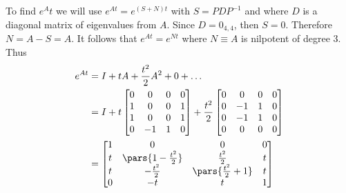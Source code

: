 To find $e^At$ we will use $e^{At} = e^{(S+N)t}$ with $S = PDP^{-1}$ and where $D$ is a diagonal matrix of eigenvalues from $A$. Since $D = 0_{4,4}$, then $S = 0$. Therefore $N = A-S =  A$. It follows that $e^{At} = e^{Nt}$ where $N \equiv A$ is nilpotent of degree 3. Thus
\begin{align*}
    e^{At} &= I + tA + \frac{t^2}{2}A^2 + 0 + \dots\\
    &= I + t\begin{bmatrix}
        0&0&0&0 \\ 1&0&0&1 \\ 1&0&0&1 \\ 0&-1&1&0
    \end{bmatrix} + \frac{t^2}{2}\begin{bmatrix}
        0&0&0&0 \\ 0&-1&1&0 \\ 0&-1&1&0 \\ 0&0&0&0
    \end{bmatrix}\\
    &= \begin{bmatrix}
        1 & 0 & 0 & 0 \\
        t & \pars{1 - \frac{t^2}{2}} & \frac{t^2}{2} & t \\
        t & -\frac{t^2}{2} & \pars{\frac{t^2}{2} + 1} & t \\
        0 & -t & t &1
    \end{bmatrix}
\end{align*}